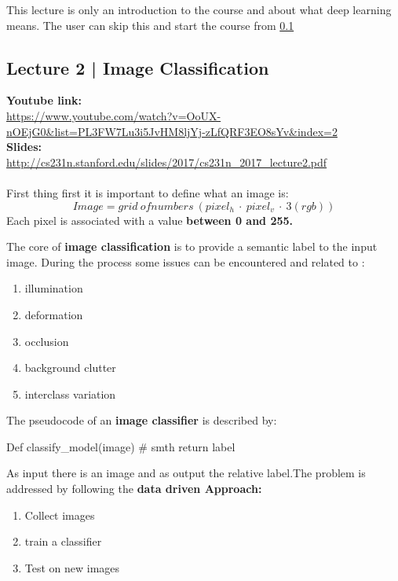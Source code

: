 \documentclass[11pt]{article}
\begin{document}
This lecture is only an introduction to the course and about what deep learning means. The user can skip this and start the course from \ref{lec2}

\clearpage
\subsection{Lecture 2 | Image Classification}\label{lec2}
\textbf{Youtube link:}\\
\url{https://www.youtube.com/watch?v=OoUX-nOEjG0&list=PL3FW7Lu3i5JvHM8ljYj-zLfQRF3EO8sYv&index=2}\\
\textbf{Slides:}\\
\url{http://cs231n.stanford.edu/slides/2017/cs231n_2017_lecture2.pdf}\\\\
First thing first it is important to define what an image is:
\begin{equation}
 Image = grid \ of numbers \ (pixel_{h} \ \cdot \ pixel_{v} \ \cdot\ 3(rgb) )
\end{equation}{}
Each pixel is associated with a value \textbf{between 0 and 255.}

The core of \textbf{image classification} is to provide a semantic label to the input image. During the process some issues can be encountered
and related to :
 \begin{multicols}{3}
\begin{enumerate}
    \item illumination
    \item deformation
    \item occlusion
    \item background clutter
    \item interclass variation
\end{enumerate}{}
\end{multicols}

The pseudocode of an \textbf{image classifier }is described by:
\begin{python}
Def classify_model(image)
# smth
return label
\end{python}{}
As input there is an image and as  output the relative label.The problem is addressed by following the \textbf{data driven Approach:}
 \begin{multicols}{3}
\begin{enumerate}
    \item Collect images
    \item train a classifier
    \item Test on new images
\end{enumerate}{}
\end{multicols}
\end{document}
